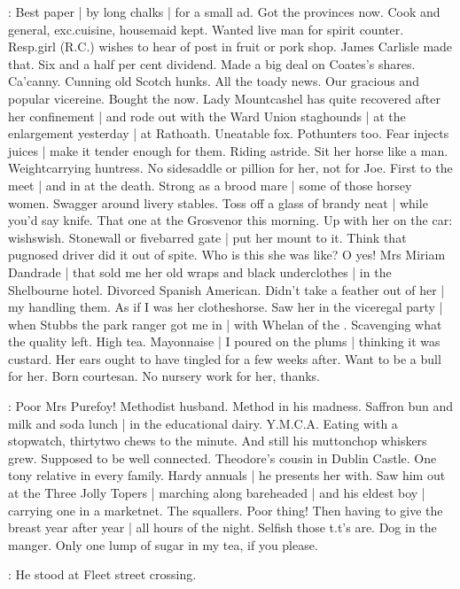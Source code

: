 \BloomInt:
Best paper |
by long chalks |
for a small ad.
Got the provinces now.
Cook and general,
exc.\@ cuisine,
housemaid kept.
Wanted live man for spirit counter.
Resp.\@ girl (R.C.\@) wishes to hear of post in fruit or pork shop.
James Carlisle made that.
Six and a half per cent dividend.
Made a big deal on Coates's shares.
Ca'canny.
Cunning old Scotch hunks.
All the toady news.
Our gracious and popular vicereine.
Bought the  now.
Lady Mountcashel has quite recovered after her confinement |
and rode out with the Ward Union staghounds |
at the enlargement yesterday |
at Rathoath.
Uneatable fox.
Pothunters too.
Fear injects juices |
make it tender enough for them.
Riding astride.
Sit her horse like a man.
Weightcarrying huntress.
No sidesaddle or pillion for her,
not for Joe.
First to the meet |
and in at the death.
Strong as a brood mare |
some of those horsey women.
Swagger around livery stables.
Toss off a glass of brandy neat |
while you'd say knife.
That one at the Grosvenor this morning.
Up with her on the car:
wishswish.
Stonewall or fivebarred gate |
put her mount to it.
Think that pugnosed driver did it out of spite.
Who is this she was like?
O yes!
Mrs Miriam Dandrade |
that sold me
her old wraps and black underclothes |
in the Shelbourne hotel.
Divorced Spanish American.
Didn't take a feather out of her |
my handling them.
As if I was her clotheshorse.
Saw her in the viceregal party |
when Stubbs the park ranger got me in |
with Whelan of the .
Scavenging what the quality left.
High tea.
Mayonnaise |
I poured on the plums |
thinking it was custard.
Her ears ought to have tingled for a few weeks after.
Want to be a bull for her.
Born courtesan.
No nursery work for her,
thanks.

\BloomInt:
Poor Mrs Purefoy!
Methodist husband.
Method in his madness.
Saffron bun and milk and soda lunch |
in the educational dairy.
Y.M.C.A\@.
Eating with a stopwatch,
thirtytwo chews to the minute.
And still his muttonchop whiskers grew.
Supposed to be well connected.
Theodore's cousin in Dublin Castle.
One tony relative in every family.
Hardy annuals |
he presents her with.
Saw him out at the Three Jolly Topers |
marching along bareheaded |
and his eldest boy |
carrying one in a marketnet.
The squallers.
Poor thing!
Then having to give the breast year after year |
all hours of the night.
Selfish those t.t's are.
Dog in the manger.
Only one lump of sugar in my tea,
if you please.

:
He stood at Fleet street crossing.

